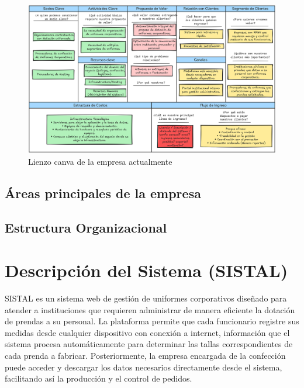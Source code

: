 \begin{figure}[htbp]
    \centering
    \includegraphics[width=\textwidth]{figuras/diagramas-actuales/lienzo-canva}
    \caption{Lienzo canva de la empresa actualmente}
    \label{fig:lienzo-canva-actual}
\end{figure}

\subsection{Áreas principales de la empresa}


\subsection{Estructura Organizacional}


\section{Descripción del Sistema (SISTAL)}

SISTAL es un sistema web de gestión de uniformes corporativos diseñado para atender a instituciones que requieren administrar de manera eficiente la dotación de prendas a su personal. La plataforma permite que cada funcionario registre sus medidas desde cualquier dispositivo con conexión a internet, información que el sistema procesa automáticamente para determinar las tallas correspondientes de cada prenda a fabricar. Posteriormente, la empresa encargada de la confección puede acceder y descargar los datos necesarios directamente desde el sistema, facilitando así la producción y el control de pedidos.

